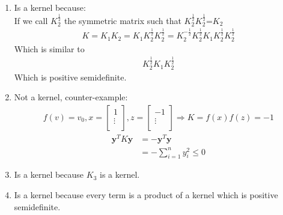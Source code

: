\begin{answer}
\begin{enumerate}
\item 
Is a kernel because:\\
If we call $K_2^\frac{1}{2}$ the symmetric matrix such that $K_2^\frac{1}{2}$$K_2^\frac{1}{2}$=$K_2$
\begin{align*}
K=K_1K_2=K_1K_2^\frac{1}{2}K_2^\frac{1}{2}=K_2^{-\frac{1}{2}}K_2^\frac{1}{2}K_1K_2^\frac{1}{2}K_2^\frac{1}{2}
\end{align*} 
Which is similar to
\begin{align*}
K_2^\frac{1}{2}K_1K_2^\frac{1}{2} 
\end{align*}
Which is positive semidefinite.
\item 
Not a kernel, counter-example:
\begin{align*}
f(v)=v_0,x=
   \begin{bmatrix} 
   1\\ 
   \vdots\\ 
   \end{bmatrix},z=
   \begin{bmatrix} 
   -1\\ 
   \vdots\\
   \end{bmatrix}\Rightarrow K=f(x)f(z)=-1
\end{align*}
\begin{align*}
\textbf{y}^TK\textbf{y}&=-\textbf{y}^T\textbf{y}\\
&=-\sum_{i=1}^n y_i^2\leq0
\end{align*}
\item 
Is a kernel because $K_3$ is a kernel.
\item 
Is a kernel because every term is a product of a kernel which is positive semidefinite.
\end{enumerate}
\end{answer}
